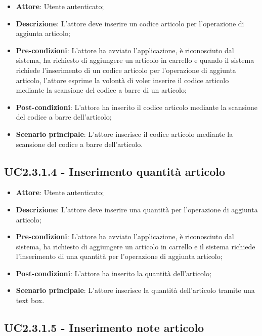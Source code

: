 \begin{itemize}
	\item \textbf{Attore}: Utente autenticato;
	\item \textbf{Descrizione}: L'attore deve inserire un codice articolo per l'operazione di aggiunta articolo;
	\item \textbf{Pre-condizioni}: L'attore ha avviato l'applicazione, è riconosciuto dal sistema, ha richiesto di aggiungere un articolo in carrello e quando il sistema richiede l'inserimento di un codice articolo per l'operazione di aggiunta articolo, l'attore esprime la volontà di voler inserire il codice articolo mediante la scansione del codice a barre di un articolo;
	\item \textbf{Post-condizioni}: L'attore ha inserito il codice articolo mediante la scansione del codice a barre dell'articolo;
	\item \textbf{Scenario principale}: L'attore inserisce il codice articolo mediante la scansione del codice a barre dell'articolo.
\end{itemize}

\subsection{UC2.3.1.4 - Inserimento quantità articolo}

\begin{itemize}
	\item \textbf{Attore}: Utente autenticato;
	\item \textbf{Descrizione}: L'attore deve inserire una quantità per l'operazione di aggiunta articolo;
	\item \textbf{Pre-condizioni}: L'attore ha avviato l'applicazione, è riconosciuto dal sistema, ha richiesto di aggiungere un articolo in carrello e il sistema richiede l'inserimento di una quantità per l'operazione di aggiunta articolo;
	\item \textbf{Post-condizioni}: L'attore ha inserito la quantità dell'articolo;
	\item \textbf{Scenario principale}: L'attore inserisce la quantità dell'articolo tramite una text box.
\end{itemize}

\subsection{UC2.3.1.5 - Inserimento note articolo}

